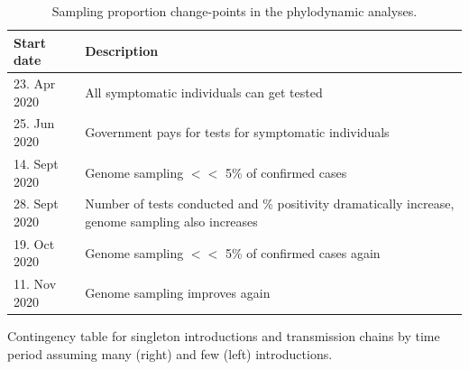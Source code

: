 \documentclass[9pt,twoside,lineno]{pnas-new}
\begin{document}
\begin{table}[H]
\centering
\caption{Sampling proportion change-points in the phylodynamic analyses.}
\label{tab:CHE_samp_prob_change_dates}
\begin{tabular}{ll}
\hline
Start date & Description \\
\hline
23. Apr 2020 & All symptomatic individuals can get tested \\
25. Jun 2020 & Government pays for tests for symptomatic individuals \\
14. Sept 2020 & Genome sampling $<<$ 5\% of confirmed cases \\
28. Sept 2020 & Number of tests conducted and \% positivity dramatically increase, genome sampling also increases \\
19. Oct 2020 & Genome sampling $<<$ 5\% of confirmed cases again \\
11. Nov 2020 & Genome sampling improves again \\
\hline
\end{tabular}
\end{table}

\begin{table}[H]
\caption{Contingency table for singleton introductions and transmission chains by time period assuming many (right) and few (left)  introductions.}
\label{tab:lockdown-contingency}


\end{table}

\newpage




\end{document}

